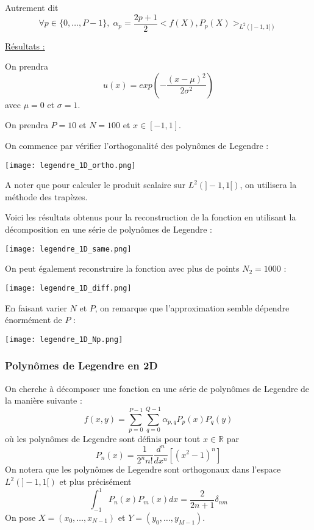 Autrement dit
$$\forall p\in\{0,\dots,P-1\}, \; \alpha_p = \frac{2p+1}{2}<f(X),P_p(X)>_{L^2(]-1,1[)}$$

\underline{Résultats :}

On prendra
$$u(x)=exp\left(-\frac{(x-\mu)^2}{2\sigma^2}\right)$$
avec $\mu=0$ et $\sigma=1$.

On prendra $P=10$ et $N=100$ et $x\in[-1,1]$.

On commence par vérifier l'orthogonalité des polynômes de Legendre :

\begin{minipage}{\linewidth}
	\centering
	\texttt{[image: legendre\_1D\_ortho.png]}
\end{minipage}

\begin{Rem}
	A noter que pour calculer le produit scalaire sur $L^2(]-1,1[)$, on utilisera la méthode des trapèzes.
\end{Rem}

Voici les résultats obtenus pour la reconstruction de la fonction en utilisant la décomposition en une série de polynômes de Legendre :

\begin{minipage}{\linewidth}
	\centering
	\texttt{[image: legendre\_1D\_same.png]}
\end{minipage}

On peut également reconstruire la fonction avec plus de points $N_2=1000$ :

\begin{minipage}{\linewidth}
	\centering
	\texttt{[image: legendre\_1D\_diff.png]}
\end{minipage}

En faisant varier $N$ et $P$, on remarque que l'approximation semble dépendre énormément de $P$ :

\begin{minipage}{\linewidth}
	\centering
	\texttt{[image: legendre\_1D\_Np.png]}
\end{minipage}

\subsubsection{Polynômes de Legendre en 2D}

On cherche à décomposer une fonction en une série de polynômes de Legendre de la manière suivante :
\begin{equation}
	f(x,y)=\sum_{p=0}^{P-1}\sum_{q=0}^{Q-1}\alpha_{p,q}P_p(x)P_q(y)
	\label{decomp}
\end{equation}
où les polynômes de Legendre sont définis pour tout $x\in\mathbb{R}$ par
$$P_n(x)=\frac{1}{2^n n!}\frac{d^n}{dx^n}[(x^2-1)^n]$$
On notera que les polynômes de Legendre sont orthogonaux dans l'espace $L^2(]-1,1[)$ et plus précisément
\begin{equation}
	\int_{-1}^1 P_n(x)P_m(x)dx=\frac{2}{2n+1}\delta_{nm} 
	\label{ortho}
\end{equation}
On pose $X=(x_0,\dots,x_{N-1})$ et $Y=(y_0,\dots,y_{M-1})$.

